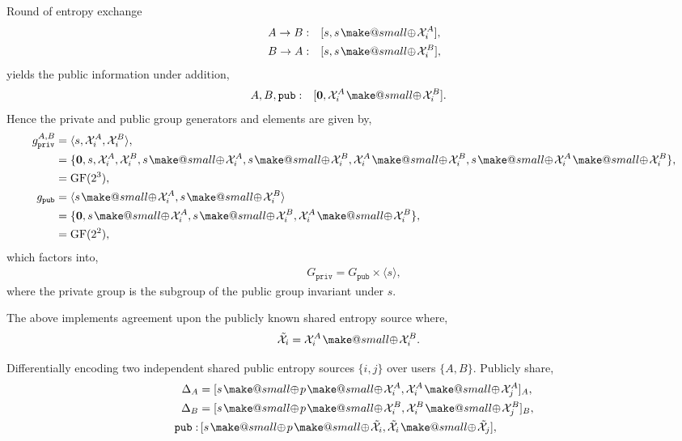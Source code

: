 \documentclass[twocolumn, aps, amsmath, amssymb, nofootinbib, superscriptaddress, longbibliography, doublefloatfix, table-of-contents, eqsecnum, rmp]{revtex4-2}
\makeatletter
\def\zerovec{\mathbf{0}}
\newcommand{\soplus}{{{\hspace{1pt}}{\mathbin{\mathpalette\make@small{\mathbin\oplus}}}}{\hspace{1pt}}}
\newcommand{\make@small}[2]{%
  \vcenter{\hbox{%
    \scalebox{0.6}{$\m@th#1#2$}%
  }}%
}
\makeatother
\begin{document}
Round of entropy exchange
\begin{align}
	A\to B:\quad &[s, s\soplus \mathcal{X}_i^A], \nonumber\\
	B\to A:\quad &[s, s\soplus \mathcal{X}_i^B],
\end{align}
yields the public information under addition,
\begin{align}
	A,B,\mathtt{pub}:\quad &[\zerovec, \mathcal{X}_i^A \soplus \mathcal{X}_i^B].
\end{align}
Hence the private and public group generators and elements are given by,
\begin{align}
	g_\mathtt{priv}^{A,B} &= \langle s, \mathcal{X}_i^A, \mathcal{X}_i^B \rangle,\nonumber\\
	&= \{\zerovec, s, \mathcal{X}_i^A, \mathcal{X}_i^B, s\soplus \mathcal{X}_i^A, s\soplus \mathcal{X}_i^B, \mathcal{X}_i^A \soplus \mathcal{X}_i^B, s\soplus \mathcal{X}_i^A \soplus \mathcal{X}_i^B \},\nonumber\\
	&= \mathrm{GF}(2^3), \nonumber\\
	g_\mathtt{pub} &= \langle s\soplus \mathcal{X}_i^A, s\soplus \mathcal{X}_i^B \rangle \nonumber\\
	&= \{\zerovec, s\soplus \mathcal{X}_i^A, s\soplus \mathcal{X}_i^B, \mathcal{X}_i^A \soplus \mathcal{X}_i^B \}, \nonumber\\
	&= \mathrm{GF}(2^2),
\end{align}
which factors into,
\begin{align}
	G_\mathtt{priv} = G_\mathtt{pub} \times \langle s\rangle,
\end{align}
where the private group is the subgroup of the public group invariant under $s$.

The above implements agreement upon the publicly known shared entropy source where,
\begin{align}
	\tilde{\mathcal{X}}_i &= \mathcal{X}_i^A \soplus \mathcal{X}_i^B.
\end{align}

Differentially encoding two independent shared public entropy sources $\{i,j\}$ over users $\{A,B\}$. Publicly share,
\begin{align}
\Delta_A &= [s\soplus p\soplus{\mathcal{X}}_i^A, {\mathcal{X}}_i^A \soplus {\mathcal{X}}_j^A]_A,\nonumber\\
\Delta_B &= [s\soplus p\soplus {\mathcal{X}}_i^B, {\mathcal{X}}_i^B \soplus {\mathcal{X}}_j^B]_B,\nonumber\\
\mathtt{pub}:&\, [s\soplus p\soplus \tilde{\mathcal{X}}_i, \tilde{\mathcal{X}}_i \soplus \tilde{\mathcal{X}}_j],
\end{align}
\end{document}
